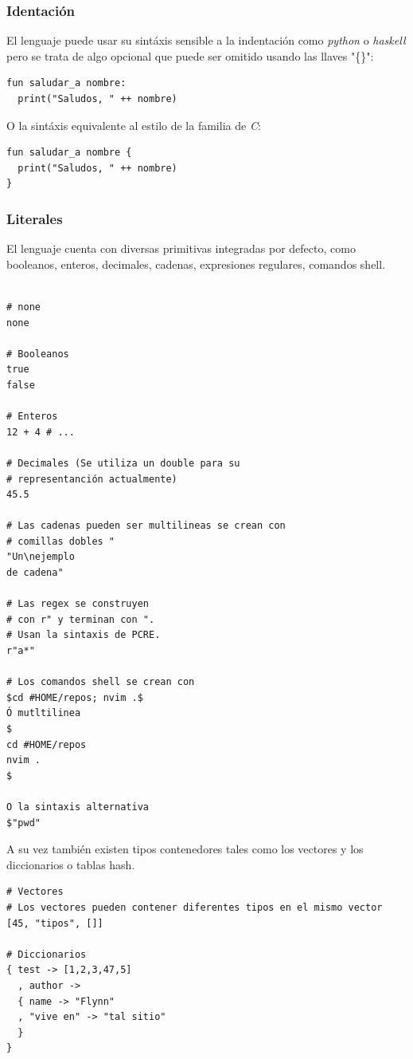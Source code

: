 \documentclass[11pt]{article}
\begin{document}
\subsubsection{Identación}
\label{sec:orgdacadc7}

\label{org879552c}
El lenguaje puede usar su sintáxis sensible a la indentación como \emph{python} o \emph{haskell} pero se trata de algo opcional que puede ser omitido usando las llaves "\{\}":

\begin{verbatim}
fun saludar_a nombre:
  print("Saludos, " ++ nombre)
\end{verbatim}

O la sintáxis equivalente al estilo de la familia de \emph{C}:
\begin{verbatim}
fun saludar_a nombre {
  print("Saludos, " ++ nombre)
}
\end{verbatim}

\subsubsection{Literales}
\label{sec:orgd795b38}

El lenguaje cuenta con diversas primitivas integradas por defecto, como
booleanos, enteros, decimales, cadenas, expresiones regulares, comandos
shell.

\begin{verbatim}

# none
none

# Booleanos
true
false

# Enteros
12 + 4 # ...

# Decimales (Se utiliza un double para su
# representanción actualmente)
45.5

# Las cadenas pueden ser multilineas se crean con
# comillas dobles "
"Un\nejemplo
de cadena"

# Las regex se construyen
# con r" y terminan con ".
# Usan la sintaxis de PCRE.
r"a*"

# Los comandos shell se crean con
$cd #HOME/repos; nvim .$
Ó mutltilinea
$
cd #HOME/repos
nvim .
$

O la sintaxis alternativa
$"pwd"
\end{verbatim}

A su vez también existen tipos contenedores tales como los vectores y los
diccionarios o tablas hash.

\begin{verbatim}
# Vectores
# Los vectores pueden contener diferentes tipos en el mismo vector
[45, "tipos", []]

# Diccionarios
{ test -> [1,2,3,47,5]
  , author ->
  { name -> "Flynn"
  , "vive en" -> "tal sitio"
  }
}

\end{verbatim}
\end{document}
